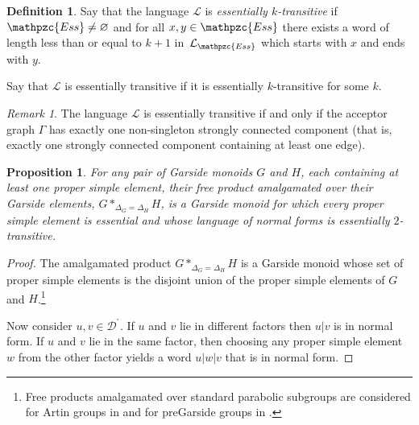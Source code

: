 \documentclass[a4paper,final]{article}
\let\emptyset\varnothing
\theoremstyle{plain}
\newtheorem{proposition}[proposition]{Proposition}
\theoremstyle{remark}
\newtheorem*{remark}{Remark}
\theoremstyle{definition}
\newtheorem{definition}[definition]{Definition}
\begin{document}
\begin{definition}
  Say that the language ${\mathcal{L}}$ is \emph{essentially $k$-transitive}
  if ${\mathpzc{Ess}} \ne \emptyset$ and for all $x, y \in {\mathpzc{Ess}}$ there exists a word of
  length less than or equal to $k+1$ in~${\mathcal{L}}_{\mathpzc{Ess}}$ which starts with
  $x$ and ends with $y$.

  Say that ${\mathcal{L}}$ is essentially transitive if it is essentially
  $k$-transitive for some $k$.
\end{definition}

{}

\begin{remark} 
  The language ${\mathcal{L}}$ is essentially transitive if and only if the
  acceptor graph ${\Gamma}$ has exactly one non-singleton strongly connected component (that is, exactly one strongly connected component containing at least one edge).
\end{remark}

\begin{proposition}
  For any pair of Garside monoids $G$ and $H$, each containing at
  least one proper simple element, their free product amalgamated over their Garside elements,
  $G*_{\Delta_G = \Delta_H} H$, is a Garside monoid for which
  every proper simple element is essential and whose language of
  normal forms is essentially $2$-transitive.
\end{proposition}
\begin{proof}
  The amalgamated product $G*_{\Delta_G = \Delta_H} H$ is a Garside
  monoid \cite[Prop.~5.3]{DehornoyParis99}\cite{Froehle07} whose set of
  proper simple elements is the disjoint union of the proper simple
  elements of $G$ and $H$.\footnote{Free products amalgamated over
    standard parabolic subgroups are considered for Artin groups in
    \cite{DehornoyGodelle13} and for preGarside groups in
    \cite{GodelleParis12}.}

  Now consider $u,v \in {{\mathcal{D}}^{\!{}^{\circ}\!}}$.
  If $u$ and $v$ lie in different factors then $u|v$ is in normal form.
  If $u$ and $v$ lie in the same factor, then choosing any proper simple
  element $w$ from the other factor yields a word $u| w| v$ that is in
  normal form.
\end{proof}
\end{document}
